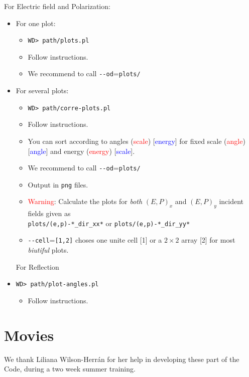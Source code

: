 \documentclass[preprint,12pt]{revtex4}
\def\colore{red}
\begin{document}
For Electric field and Polarization:
\begin{itemize}
\item For one plot:
\begin{itemize}
\item \verb=WD> path/plots.pl =
\item Follow instructions.
\item We recommend to call \verb=--od==\verb=plots/=
\end{itemize}
\item For several plots:
\begin{itemize}
\item 
\verb=WD> path/corre-plots.pl=
\item Follow instructions. 
\item You can sort according to angles (\textcolor{red}{scale})
 [\textcolor{blue}{energy}] for fixed scale
  (\textcolor{red}{angle}) [\textcolor{blue}{angle}] and energy
  (\textcolor{red}{energy})
 [\textcolor{blue}{scale}].
\item We recommend to call \verb=--od==\verb=plots/=
\item Output in \verb=png= files.
\item \textcolor{\colore}{Warning}: Calculate the plots for {\it both}
    $(E,P)_x$ and $(E,P)_y$ incident fields given as\\
 \verb=plots/(e,p)-*_dir_xx*= or
 \verb=plots/(e,p)-*_dir_yy*=
\item \verb=--cell==\verb=[1,2]= choses one unite cell [1] or a
  $2\times 2$ array [2] for most {\it biutiful} plots.
\end{itemize}
 For Reflection
\item \verb=WD> path/plot-angles.pl=
\begin{itemize}
\item Follow instructions. 
\end{itemize}

\end{itemize}
\section{Movies}

We thank Liliana Wilson-Herrán for her help in developing these part
of the Code, during a two week summer training.
\end{document}
